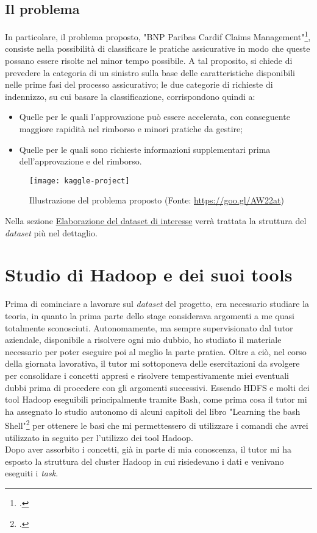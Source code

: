 \subsection{Il problema}
In particolare, il problema proposto, "BNP Paribas Cardif Claims Management"\footcite{https://www.kaggle.com/c/bnp-paribas-cardif-claims-management}, consiste nella possibilità di classificare le pratiche assicurative in modo che queste possano essere risolte nel minor tempo possibile. A tal proposito, si chiede di prevedere la categoria di un sinistro sulla base delle caratteristiche disponibili nelle prime fasi del processo assicurativo; le due categorie di richieste di indennizzo, su cui basare la classificazione, corrispondono quindi a:
\begin{itemize}
	\item Quelle per le quali l'approvazione può essere accelerata, con conseguente maggiore rapidità nel rimborso e minori pratiche da gestire;
	\item Quelle per le quali sono richieste informazioni supplementari prima dell'approvazione e del rimborso.
\end{itemize}
\clearpage
\begin{figure}[!h] 
	\centering 
	\texttt{[image: kaggle-project]}
	\caption{Illustrazione del problema proposto (Fonte: \href{https://goo.gl/AW22at}{https://goo.gl/AW22at})}
\end{figure}
Nella sezione \hyperref[dataset]{Elaborazione del dataset di interesse} verrà trattata la struttura del \textit{dataset} più nel dettaglio.


\section{Studio di Hadoop e dei suoi tools}
Prima di cominciare a lavorare sul \textit{dataset} del progetto, era necessario studiare la teoria, in quanto la prima parte dello stage considerava argomenti a me quasi totalmente sconosciuti.
Autonomamente, ma sempre supervisionato dal tutor aziendale, disponibile a risolvere ogni mio dubbio, ho studiato il materiale necessario per poter eseguire poi al meglio la parte pratica. Oltre a ciò, nel corso della giornata lavorativa, il tutor mi sottoponeva delle esercitazioni da svolgere per consolidare i concetti appresi e risolvere tempestivamente miei eventuali dubbi prima di procedere con gli argomenti successivi.
Essendo \gls{HDFS} e molti dei tool Hadoop eseguibili principalmente tramite \gls{Bash}, come prima cosa il tutor mi ha assegnato lo studio autonomo di alcuni capitoli del libro "Learning the bash Shell"\footcite{http://shop.oreilly.com/product/9780596009656.do} per ottenere le basi che mi permettessero di utilizzare i comandi che avrei utilizzato in seguito per l'utilizzo dei tool Hadoop.\\
Dopo aver assorbito i concetti, già in parte di mia conoscenza, il tutor mi ha esposto la struttura del \gls{cluster} Hadoop in cui risiedevano i dati e venivano eseguiti i \textit{task}. 

